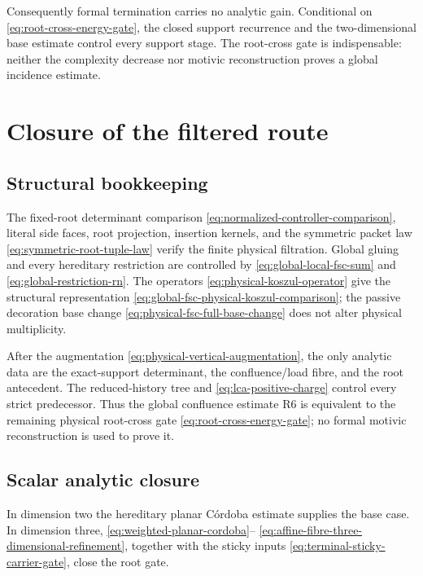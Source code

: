 \documentclass[11pt]{article}
\begin{document}
Consequently formal termination carries no analytic gain.  Conditional on
\eqref{eq:root-cross-energy-gate}, the closed support recurrence and the
two-dimensional base estimate control every support stage.  The root-cross
gate is indispensable: neither the complexity decrease nor motivic
reconstruction proves a global incidence estimate.

\section{Closure of the filtered route}

\subsection{Structural bookkeeping}

The fixed-root determinant comparison
\eqref{eq:normalized-controller-comparison}, literal side faces, root
projection, insertion kernels, and the symmetric packet law
\eqref{eq:symmetric-root-tuple-law} verify the finite physical filtration.
Global gluing and every hereditary restriction are controlled by
\eqref{eq:global-local-fsc-sum} and
\eqref{eq:global-restriction-rn}.  The operators
\eqref{eq:physical-koszul-operator} give the structural representation
\eqref{eq:global-fsc-physical-koszul-comparison}; the passive decoration base
change \eqref{eq:physical-fsc-full-base-change} does not alter physical
multiplicity.

After the augmentation \eqref{eq:physical-vertical-augmentation}, the only
analytic data are the exact-support determinant, the confluence/load fibre,
and the root antecedent.  The reduced-history tree and
\eqref{eq:lca-positive-charge} control every strict predecessor.  Thus the
global confluence estimate R6 is equivalent to the remaining physical
root-cross gate \eqref{eq:root-cross-energy-gate}; no formal motivic
reconstruction is used to prove it.

\subsection{Scalar analytic closure}

In dimension two the hereditary planar C\'ordoba estimate \cite{Cordoba77} supplies the base
case.  In dimension three,
\eqref{eq:weighted-planar-cordoba}--%
\eqref{eq:affine-fibre-three-dimensional-refinement}, together with the sticky
inputs \eqref{eq:terminal-sticky-carrier-gate}, close the root gate.
\end{document}
